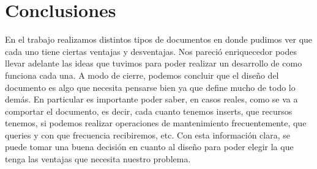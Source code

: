 \documentclass[11pt, a4paper]{article}
\begin{document}

\section{Conclusiones}

En el trabajo realizamos distintos tipos de documentos en donde pudimos ver que cada uno tiene ciertas ventajas y desventajas. Nos pareci\'o enriquecedor podes llevar adelante las ideas que tuvimos para poder realizar un desarrollo de como funciona cada una. A modo de cierre, podemos concluir que el dise\~no del documento es algo que necesita pensarse bien ya que define mucho de todo lo dem\'as. En particular es importante poder saber, en casos reales, como se va a comportar el documento, es decir, cada cuanto tenemos inserts, que recursos tenemos, si podemos realizar operaciones de mantenimiento frecuentemente, que queries y con que frecuencia recibiremos, etc. Con esta informaci\'on clara, se puede tomar una buena decisi\'on en cuanto al dise\~no para poder elegir la que tenga las ventajas que necesita nuestro problema.
\end{document}
